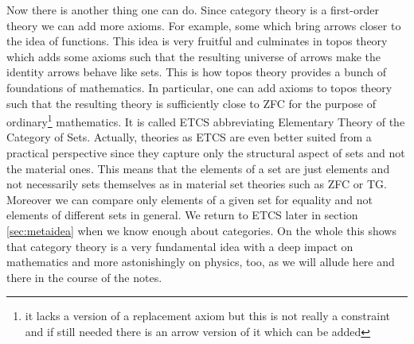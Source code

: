 Now there is another thing one can do. Since category theory is a first-order theory we can add more axioms. For example, some which bring arrows closer to the idea of functions. This idea is very fruitful and culminates in topos theory which adds some axioms such that the resulting universe of arrows make the identity arrows behave like sets. This is how topos theory provides a bunch of foundations of mathematics. In particular, one can add axioms to topos theory such that the resulting theory is sufficiently close to ZFC for the purpose of ordinary\footnote{it lacks a version of a replacement axiom but this is not really a constraint and if still needed there is an arrow version of it which can be added} mathematics. It is called ETCS abbreviating {\glqq}Elementary Theory of the Category of Sets{\grqq}. Actually, theories as ETCS are even better suited from a practical perspective since they capture only the structural aspect of sets and not the material ones. This means that the elements of a set are just elements and not necessarily sets themselves as in material set theories such as ZFC or TG. Moreover we can compare only elements of a given set for equality and not elements of different sets in general. We return to ETCS later in section \ref{sec:metaidea} when we know enough about categories. On the whole this shows that category theory is a very fundamental idea with a deep impact on mathematics and more astonishingly on physics, too, as we will allude here and there in the course of the notes.
\\

